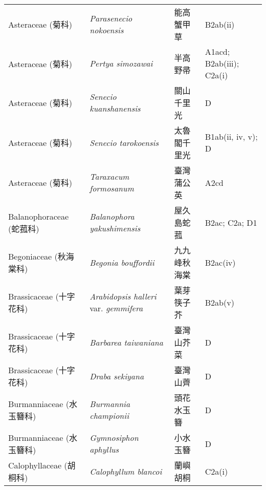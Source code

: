 \begin{longtable}{p{3cm}p{5cm}p{3cm}p{4cm}}
    Asteraceae (菊科) & \textit{Parasenecio nokoensis}  & 能高蟹甲草 & B2ab(ii) \index{Parasenecio@\textit{Parasenecio}!nokoensis@\textit{nokoensis}}  \index{能高蟹甲草} \\
    Asteraceae (菊科) & \textit{Pertya simozawai}  & 半高野帚 & A1acd; B2ab(iii); C2a(i) \index{Pertya@\textit{Pertya}!simozawai@\textit{simozawai}}  \index{半高野帚} \\
    Asteraceae (菊科) & \textit{Senecio kuanshanensis}  & 關山千里光 & D \index{Senecio@\textit{Senecio}!kuanshanensis@\textit{kuanshanensis}}  \index{關山千里光} \\
    Asteraceae (菊科) & \textit{Senecio tarokoensis}  & 太魯閣千里光 & B1ab(ii, iv, v); D \index{Senecio@\textit{Senecio}!tarokoensis@\textit{tarokoensis}}  \index{太魯閣千里光} \\
    Asteraceae (菊科) & \textit{Taraxacum formosanum}  & 臺灣蒲公英 & A2cd \index{Taraxacum@\textit{Taraxacum}!formosanum@\textit{formosanum}}  \index{臺灣蒲公英} \\
    Balanophoraceae (蛇菰科) & \textit{Balanophora yakushimensis}  & 屋久島蛇菰 & B2ac; C2a; D1 \index{Balanophora@\textit{Balanophora}!yakushimensis@\textit{yakushimensis}}  \index{屋久島蛇菰} \\
    Begoniaceae (秋海棠科) & \textit{Begonia bouffordii}  & 九九峰秋海棠 & B2ac(iv) \index{Begonia@\textit{Begonia}!bouffordii@\textit{bouffordii}}  \index{九九峰秋海棠} \\
    Brassicaceae (十字花科) & \textit{Arabidopsis halleri} var. \textit{gemmifera}  & 葉芽筷子芥 & B2ab(v) \index{Arabidopsis@\textit{Arabidopsis}!halleri@\textit{halleri}!var. gemmifera@var. \textit{gemmifera}}  \index{葉芽筷子芥} \\
    Brassicaceae (十字花科) & \textit{Barbarea taiwaniana}  & 臺灣山芥菜 & D \index{Barbarea@\textit{Barbarea}!taiwaniana@\textit{taiwaniana}}  \index{臺灣山芥菜} \\
    Brassicaceae (十字花科) & \textit{Draba sekiyana}  & 臺灣山薺 & D \index{Draba@\textit{Draba}!sekiyana@\textit{sekiyana}}  \index{臺灣山薺} \\
    Burmanniaceae (水玉簪科) & \textit{Burmannia championii}  & 頭花水玉簪 & D \index{Burmannia@\textit{Burmannia}!championii@\textit{championii}}  \index{頭花水玉簪} \\
    Burmanniaceae (水玉簪科) & \textit{Gymnosiphon aphyllus}  & 小水玉簪 & D \index{Gymnosiphon@\textit{Gymnosiphon}!aphyllus@\textit{aphyllus}}  \index{小水玉簪} \\
    Calophyllaceae (胡桐科) & \textit{Calophyllum blancoi}  & 蘭嶼胡桐 & C2a(i) \index{Calophyllum@\textit{Calophyllum}!blancoi@\textit{blancoi}}  \index{蘭嶼胡桐} \\

\end{longtable}
